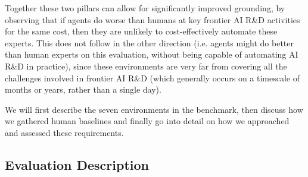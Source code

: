 \documentclass{article}
\begin{document}
Together these two pillars can allow for significantly improved grounding, by observing that if agents do worse than humans at key frontier AI R\&D activities for the same cost, then they are unlikely to cost-effectively automate these experts. This does not follow in the other direction (i.e. agents might do better than human experts on this evaluation, without being capable of automating AI R\&D in practice), since these environments are very far from covering all the challenges involved in frontier AI R\&D (which generally occurs on a timescale of months or years, rather than a single day).

We will first describe the seven environments in the benchmark, then discuss how we gathered human baselines and finally go into detail on how we approached and assessed these requirements.

\subsection{Evaluation Description}
\end{document}
